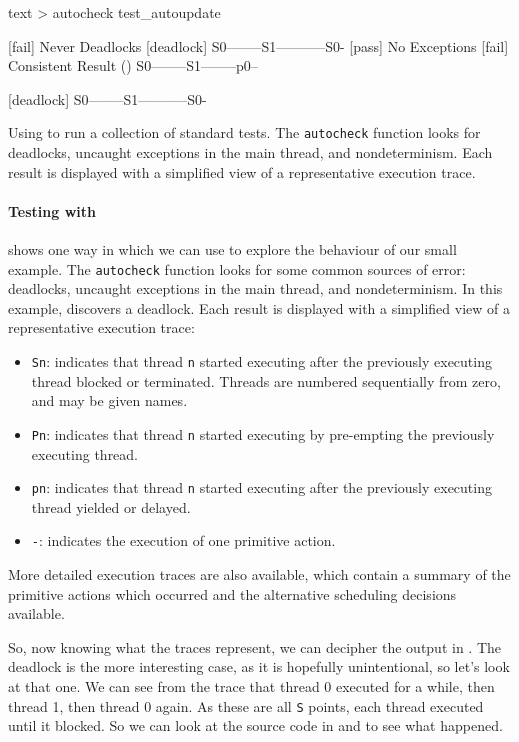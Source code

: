 \begin{listing}
\centering
\begin{cminted}{text}
> autocheck test_autoupdate

[fail] Never Deadlocks
        [deadlock] S0--------S1-----------S0-
[pass] No Exceptions
[fail] Consistent Result
        () S0--------S1--------p0--

        [deadlock] S0--------S1-----------S0-
\end{cminted}
\caption[Using \dejafu{} to run a collection of standard tests.]{Using \dejafu{} to run a collection of standard tests.  The \texttt{autocheck} function looks for deadlocks, uncaught exceptions in the main thread, and nondeterminism.  Each result is displayed with a simplified view of a representative execution trace.}\label{lst:autoupdate_example2}
\end{listing}

\paragraph{Testing with \dejafu{}}
 shows one way in which we can use
\dejafu{} to explore the behaviour of our small example.  The
\verb|autocheck| function looks for some common sources of error:
deadlocks, uncaught exceptions in the main thread, and nondeterminism.
In this example, \dejafu{} discovers a deadlock.  Each result is
displayed with a simplified view of a representative execution trace:

\begin{itemize}
\item \verb|Sn|: indicates that thread \verb|n| started executing
  after the previously executing thread blocked or terminated.
  Threads are numbered sequentially from zero, and may be given names.
\item \verb|Pn|: indicates that thread \verb|n| started executing by
  pre-empting the previously executing thread.
\item \verb|pn|: indicates that thread \verb|n| started executing
  after the previously executing thread yielded or delayed.
\item \verb|-|: indicates the execution of one primitive action.
\end{itemize}

More detailed execution traces are also available, which contain a
summary of the primitive actions which occurred and the alternative
scheduling decisions available.

So, now knowing what the traces represent, we can decipher the output
in .  The deadlock is the more
interesting case, as it is hopefully unintentional, so let's look at
that one.  We can see from the trace that thread 0 executed for a
while, then thread 1, then thread 0 again.  As these are all \verb|S|
points, each thread executed until it blocked.  So we can look at the
source code in  and
 to see what happened.

